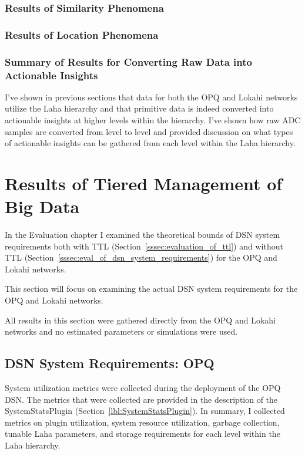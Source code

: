 \subsubsection{Results of Similarity Phenomena}

\subsubsection{Results of Location Phenomena}

\subsubsection{Summary of Results for Converting Raw Data into Actionable Insights}

I've shown in previous sections that data for both the OPQ and Lokahi networks utilize the Laha hierarchy and that primitive data is indeed converted into actionable insights at higher levels within the hierarchy. I've shown how raw ADC samples are converted from level to level and provided discussion on what types of actionable insights can be gathered from each level within the Laha hierarchy.

\section{Results of Tiered Management of Big Data}\label{sec:dsn-system-requirements}

In the Evaluation chapter I examined the theoretical bounds of DSN system requirements both with TTL (Section~\ref{sssec:evaluation_of_ttl}) and without TTL (Section~\ref{sssec:eval_of_dsn_system_requirements}) for the OPQ and Lokahi networks.

This section will focus on examining the actual DSN system requirements for the OPQ and Lokahi networks.

All results in this section were gathered directly from the OPQ and Lokahi networks and no estimated parameters or simulations were used.

\subsection{DSN System Requirements: OPQ}\label{subsec:dsn-system-requirements:-opq}

System utilization metrics were collected during the deployment of the OPQ DSN. The metrics that were collected are provided in the description of the SystemStatsPlugin (Section~\ref{lbl:SystemStatsPlugin}). In summary, I collected metrics on plugin utilization, system resource utilization, garbage collection, tunable Laha parameters, and storage requirements for each level within the Laha hierarchy.

